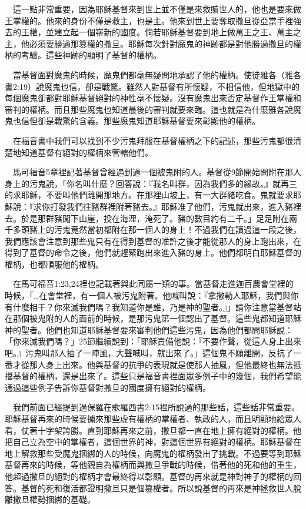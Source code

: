 \documentclass{book}
\begin{document}
　這一點非常重要，因為耶穌基督來到世上並不僅是來救贖世人的，他也是要來做王掌權的。他來的身份不僅是救主，也是主。他來到世上要奪取撒旦從亞當手裡強去的王權，並建立起一個嶄新的國度。倘若耶穌基督要到地上做萬王之王、萬主之主，他必須要勝過那篡權的撒旦。耶穌每次針對魔鬼的神跡都是對他勝過撒旦的權柄的考驗。這些神跡的顯明了基督的權柄。

　當基督面對魔鬼的時候，魔鬼們都毫無疑問地承認了他的權柄。使徒雅各（雅各書2:19）說魔鬼也信，卻是戰驚。雖然人對基督有所懷疑，不相信他，但地獄中的每個魔鬼卻都對耶穌基督絕對的神性毫不懷疑。沒有魔鬼出來否定基督作王掌權和審判的權柄。而且那些魔鬼也知道最後的審判就要來臨。這也就是為什麼雅各說魔鬼也信但卻是戰驚的含義。那些魔鬼知道耶穌基督要來彰顯他的權柄。

　在福音書中我們可以找到不少污鬼拜服在基督權柄之下的記述，那些污鬼都很清楚地知道基督有絕對的權柄來管轄他們。

　馬可福音5章裡記著基督曾經遇到過一個被鬼附的人。基督從9節開始問附在那人身上的污鬼說，「你名叫什麼？回答說：『我名叫群，因為我們多的緣故。』就再三的求耶穌，不要叫他們離開那地方。在那裡山坡上，有一大群豬吃食。鬼就要求耶穌說：『求你打發我們往豬群裡附著豬去。』耶穌准了他們，污鬼就出來，進入豬裡去。於是那群豬闖下山崖，投在海浬，淹死了。豬的數目約有二千。」足足附在兩千多頭豬上的污鬼竟然當初都附在那一個人的身上！不過我們在讀過這一段之後，我們應該會注意到那些鬼只有在得到基督的准許之後才能從那人的身上跑出來，在得到了基督的命令之後，他們就趕緊跑出來進入豬的身上。他們都明白耶穌基督的權柄，也都順服他的權柄。

　在馬可福音1:23,24裡也記載著與此同屬一類的事。當基督走進迦百農會堂裡的時候，「…在會堂裡，有一個人被污鬼附著。他喊叫說：『拿撒勒人耶穌，我們與你有什麼相干？你來滅我們嗎？我知道你是誰，乃是神的聖者。』」請你注意當基督站在那個被鬼附的人的面前的時候，是那污鬼第一個認出了基督。這些鬼都知道耶穌神的聖者。他們也知道耶穌基督要來審判他們這些污鬼，因為他們都問耶穌說：「你來滅我們嗎？」25節繼續說到：「耶穌責備他說：『不要作聲，從這人身上出來吧。』污鬼叫那人抽了一陣風，大聲喊叫，就出來了。」這個鬼不願離開，反抗了一番才從那人身上出來。他與基督的抗爭的表現就是使那人抽風，但他最終也無法抵擋基督的權柄，還是出來了。這些只是福音書裡面眾多例子中的幾個，我們希望能通過這些例子告訴你基督對撒旦的國度擁有絕對的權柄。

　我們前面已經提到過保羅在歌羅西書2:15裡所說過的那些話，這些話非常重要。耶穌基督再來的時候要擄來那些虛有權柄的掌權者、執政的人，而且明顯地給眾人看，仗著十字架誇勝。直到耶穌再來之前，撒旦都一直在地上擁有絕對的權柄。他把自己立為空中的掌權者，這個世界的神，對這個世界有絕對的權柄。耶穌基督在地上解救那些受魔鬼捆綁的人的時候，向魔鬼的權柄發出了挑戰。不過要等到耶穌基督再來的時候，等他親自為權柄而與撒旦爭戰的時候，借著他的死和他的重生，他超過撒旦的絕對的權柄才會最終得以彰顯。基督的再來就是神對神子的權柄的回答。基督的死和復活都證明撒旦只是個篡權者。所以說基督的再來是神拯救世人脫離撒旦權勢捆綁的基礎。
\end{document}
